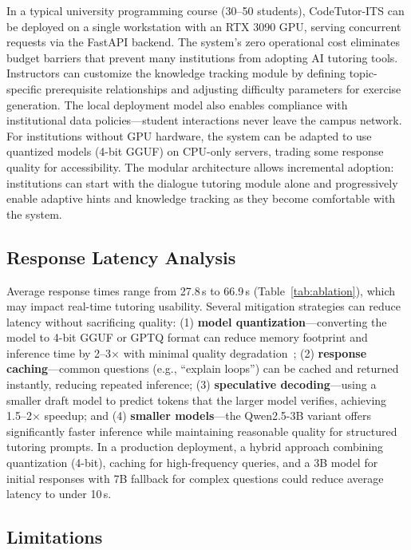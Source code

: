 \documentclass[journal,article,submit,pdftex,moreauthors]{Definitions/mdpi}
\begin{document}
In a typical university programming course (30--50 students), CodeTutor-ITS can be deployed on a single workstation with an RTX 3090 GPU, serving concurrent requests via the FastAPI backend. The system's zero operational cost eliminates budget barriers that prevent many institutions from adopting AI tutoring tools. Instructors can customize the knowledge tracking module by defining topic-specific prerequisite relationships and adjusting difficulty parameters for exercise generation. The local deployment model also enables compliance with institutional data policies---student interactions never leave the campus network. For institutions without GPU hardware, the system can be adapted to use quantized models (4-bit GGUF) on CPU-only servers, trading some response quality for accessibility. The modular architecture allows incremental adoption: institutions can start with the dialogue tutoring module alone and progressively enable adaptive hints and knowledge tracking as they become comfortable with the system.

\subsection{Response Latency Analysis}

Average response times range from 27.8\,s to 66.9\,s (Table~\ref{tab:ablation}), which may impact real-time tutoring usability. Several mitigation strategies can reduce latency without sacrificing quality: (1) \textbf{model quantization}---converting the model to 4-bit GGUF or GPTQ format can reduce memory footprint and inference time by 2--3$\times$ with minimal quality degradation~\cite{ref36}; (2) \textbf{response caching}---common questions (e.g., ``explain loops'') can be cached and returned instantly, reducing repeated inference; (3) \textbf{speculative decoding}---using a smaller draft model to predict tokens that the larger model verifies, achieving 1.5--2$\times$ speedup; and (4) \textbf{smaller models}---the Qwen2.5-3B variant offers significantly faster inference while maintaining reasonable quality for structured tutoring prompts. In a production deployment, a hybrid approach combining quantization (4-bit), caching for high-frequency queries, and a 3B model for initial responses with 7B fallback for complex questions could reduce average latency to under 10\,s.

\subsection{Limitations}
\end{document}
